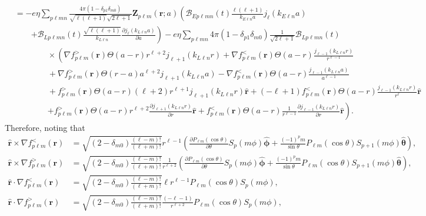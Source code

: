\documentclass{article}
\begin{document}
\begin{equation}
\begin{split}
&= -e\eta\sum_{p\ell mn}\frac{4\pi(1 - \delta_{p1}\delta_{m0})}{\sqrt{\ell(\ell + 1)}\sqrt{2\ell + 1}}\mathbf{Z}_{p\ell m}(\mathbf{r};a)\left(\mathcal{B}_{Ep\ell mn}(t)\frac{\ell(\ell + 1)}{k_{E\ell n}a}j_\ell(k_{E\ell n}a) \right.\\
&\qquad\left. + \mathcal{B}_{Lp\ell mn}(t)\frac{\sqrt{\ell(\ell + 1)}}{k_{L\ell n}}\frac{\partial j_{\ell}(k_{L\ell n}a)}{\partial a}\right) - e\eta\sum_{p\ell mn}4\pi(1 - \delta_{p1}\delta_{m0})\frac{1}{\sqrt{2\ell + 1}}\mathcal{B}_{Lp\ell mn}(t)\\
&\qquad\qquad\times\left(\nabla f_{p\ell m}^>(\mathbf{r})\Theta(a - r)r^{\ell + 2}j_{\ell + 1}(k_{L\ell n}r) + \nabla f_{p\ell m}^<(\mathbf{r})\Theta(a - r)\frac{j_{\ell - 1}(k_{L\ell n}r)}{r^{\ell - 1}}\right.\\
&\qquad\qquad + \nabla f_{p\ell m}^>(\mathbf{r})\Theta(r - a)a^{\ell + 2}j_{\ell + 1}(k_{L\ell n}a) - \nabla f_{p\ell m}^<(\mathbf{r})\Theta(a - r)\frac{j_{\ell - 1}(k_{L\ell n}a)}{a^{\ell - 1}}\\
&\qquad\qquad + f_{p\ell m}^>(\mathbf{r})\Theta(a - r)(\ell + 2)r^{\ell + 1}j_{\ell + 1}(k_{L\ell n}r)\hat{\mathbf{r}} + (-\ell + 1)f_{p\ell m}^<(\mathbf{r})\Theta(a - r)\frac{j_{\ell - 1}(k_{L\ell n}r)}{r^\ell}\hat{\mathbf{r}}\\
&\qquad\qquad\left. + f_{p\ell m}^>(\mathbf{r})\Theta(a - r)r^{\ell + 2}\frac{\partial j_{\ell + 1}(k_{L\ell n}r)}{\partial r}\hat{\mathbf{r}} + f_{p\ell m}^<(\mathbf{r})\Theta(a - r)\frac{1}{r^{\ell - 1}}\frac{\partial j_{\ell - 1}(k_{L\ell n}r)}{\partial r}\hat{\mathbf{r}}\right).
\end{split}
\end{equation}
Therefore, noting that
\begin{equation}
\begin{split}
\hat{\mathbf{r}}\times\nabla f_{p\ell m}^<(\mathbf{r}) &= \sqrt{(2 - \delta_{m0})\frac{(\ell - m)!}{(\ell + m)!}}r^{\ell - 1}\left(\frac{\partial P_{\ell m}(\cos\theta)}{\partial \theta}S_p(m\phi)\hat{\bm{\phi}} + \frac{(-1)^pm}{\sin\theta}P_{\ell m}(\cos\theta)S_{p+1}(m\phi)\hat{\bm{\theta}}\right),\\
\hat{\mathbf{r}}\times\nabla f_{p\ell m}^>(\mathbf{r}) &= \sqrt{(2 - \delta_{m0})\frac{(\ell - m)!}{(\ell + m)!}}\frac{1}{r^{\ell + 2}}\left(\frac{\partial P_{\ell m}(\cos\theta)}{\partial \theta}S_p(m\phi)\hat{\bm{\phi}} + \frac{(-1)^pm}{\sin\theta}P_{\ell m}(\cos\theta)S_{p+1}(m\phi)\hat{\bm{\theta}}\right),\\
\hat{\mathbf{r}}\cdot\nabla f_{p\ell m}^<(\mathbf{r}) &= \sqrt{(2 - \delta_{m0})\frac{(\ell - m)!}{(\ell + m)!}}\ell r^{\ell - 1}P_{\ell m}(\cos\theta)S_p(m\phi),\\
\hat{\mathbf{r}}\cdot\nabla f_{p\ell m}^>(\mathbf{r}) &= \sqrt{(2 - \delta_{m0})\frac{(\ell - m)!}{(\ell + m)!}}\frac{(-\ell - 1)}{r^{\ell + 2}}P_{\ell m}(\cos\theta)S_p(m\phi),
\end{split}
\end{equation}
\end{document}

